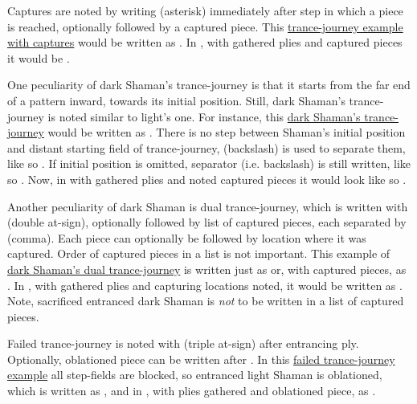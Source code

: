 Captures are noted by writing \alg{*} (asterisk) immediately after step in which
a piece is reached, optionally followed by a captured piece. This
\hyperref[fig:scn_cot_089_dark_light_shaman_interaction_end]{trance-journey example with captures}
would be written as\newline
{}. In , with gathered plies and captured
pieces it would be\newline
{}.

One peculiarity of dark Shaman's trance-journey is that it starts from the far end
of a pattern inward, towards its initial position. Still, dark Shaman's trance-journey
is noted similar to light's one. For instance, this
\hyperref[fig:scn_cot_090_dark_dark_shaman_interaction_start]{dark Shaman's trance-journey}
would be written as .
There is no step between Shaman's initial position and distant starting field of
trance-journey, \alg{\textbackslash} (backslash) is used to separate them, like so
.
If initial position is omitted, separator (i.e. backslash) is still written, like so
. Now, in  with gathered plies
and noted captured pieces it would look like so\newline
{}.

Another peculiarity of dark Shaman is dual trance-journey, which is written with 
(double at-sign), optionally followed by list of captured pieces, each separated by \alg{,}
(comma). Each piece can optionally be followed by location where it was captured. Order of
captured pieces in a list is not important. This example of
\hyperref[fig:scn_cot_092_dark_dark_shaman_double_interaction_start]{dark Shaman's dual trance-journey}
is written just as  or, with captured pieces, as
. In , with gathered plies and capturing locations noted,
it would be written as\newline
{}\newline
{}.\newline
Note, sacrificed entranced dark Shaman is \emph{not} to be written in a list of captured
pieces.

Failed trance-journey is noted with  (triple at-sign) after entrancing ply.
Optionally, oblationed piece can be written after . In this
\hyperref[fig:scn_o_36_trance_journey_failed]{failed trance-journey example} all
step-fields are blocked, so entranced light Shaman is oblationed, which is written as
, and in , with plies gathered and oblationed piece, as
.

